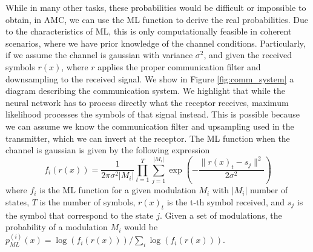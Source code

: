 \documentclass[conference]{IEEEtran}
\begin{document}
While in many other tasks, these probabilities would be difficult or impossible to obtain, in AMC, we can use the ML function to derive the real probabilities. Due to the characteristics of ML, this is only computationally feasible in coherent scenarios, where we have prior knowledge of the channel conditions. Particularly, if we assume the channel is gaussian with variance $\sigma^{2}$, and given the received symbols $r(x)$, where $r$ applies the proper communication filter and downsampling to the received signal. We show in Figure \ref{fig:comm_system} a diagram describing the communication system. We highlight that while the neural network has to process directly what the receptor receives, maximum likelihood processes the symbols of that signal instead. This is possible because we can assume we know the communication filter and upsampling used in the transmitter, which we can invert at the receptor. The ML function when the channel is gaussian is given by the following expression
\begin{equation}
	f_{i}(r(x)) = \dfrac{1}{2\pi \sigma^{2}|M_i|}\prod_{t=1}^{T} \sum_{j=1}^{|M_i|} \exp\left(-\dfrac{\lVert r(x)_t - s_j\rVert^{2}}{2 \sigma^{2}}\right)
\label{eq:ml}
\end{equation}
where $f_{i}$ is the ML function for a given modulation $M_i$ with $|M_i|$ number of states, $T$ is the number of symbols, $r(x)_t$ is the t-th symbol received, and $s_j$ is the symbol that correspond to the state $j$. Given a set of modulations, the probability of a modulation $M_i$ would be $p_{ML}^{(i)}(x) = \log(f_{i}(r(x))) / \sum_i \log(f_{i}(r(x)))$.
\end{document}
